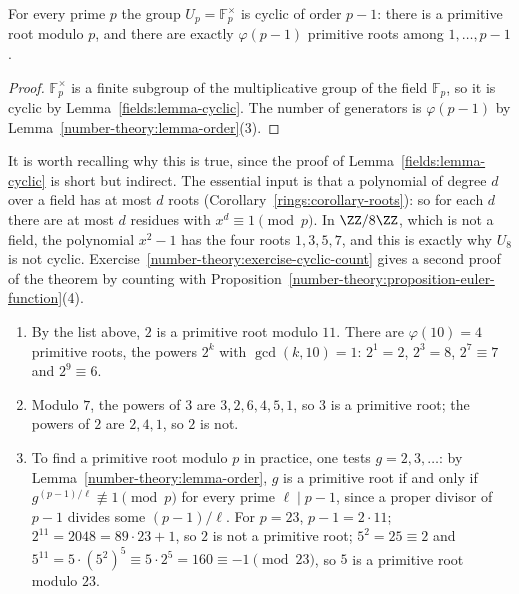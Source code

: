\begin{theorem}\label{number-theory:theorem-primitive-root-prime}
For every prime $p$ the group $U_p = \mathbb{F}_p^\times$ is cyclic of order $p - 1$: there is a primitive root modulo $p$, and there are exactly $\varphi(p - 1)$ primitive roots among $1, \ldots, p - 1$.
\end{theorem}

\begin{proof}
$\mathbb{F}_p^\times$ is a finite subgroup of the multiplicative group of the field $\mathbb{F}_p$, so it is cyclic by Lemma~\ref{fields:lemma-cyclic}. The number of generators is $\varphi(p - 1)$ by
Lemma~\ref{number-theory:lemma-order}(3).
\end{proof}

It is worth recalling why this is true, since the proof of Lemma~\ref{fields:lemma-cyclic} is short but indirect. The essential input is that a polynomial of degree $d$ over a field has at most $d$ roots
(Corollary~\ref{rings:corollary-roots}): so for each $d$ there are at most $d$ residues with $x^d \equiv 1 \pmod p$. In $\ZZ/8\ZZ$, which is not a field, the polynomial $x^2 - 1$ has the four roots
$1, 3, 5, 7$, and this is exactly why $U_8$ is not cyclic. Exercise~\ref{number-theory:exercise-cyclic-count} gives a second proof of the theorem by counting with
Proposition~\ref{number-theory:proposition-euler-function}(4).

\begin{example}\label{number-theory:example-primitive-roots}
\begin{enumerate}
\item By the list above, $2$ is a primitive root modulo $11$. There are $\varphi(10) = 4$ primitive roots, the powers $2^k$ with $\gcd(k, 10) = 1$: $2^1 = 2$, $2^3 = 8$, $2^7 \equiv 7$ and $2^9 \equiv 6$.
\item Modulo $7$, the powers of $3$ are $3, 2, 6, 4, 5, 1$, so $3$ is a primitive root; the powers of $2$ are $2, 4, 1$, so $2$ is not.
\item To find a primitive root modulo $p$ in practice, one tests $g = 2, 3, \ldots$: by Lemma~\ref{number-theory:lemma-order}, $g$ is a primitive root if and only if $g^{(p-1)/\ell} \not\equiv 1 \pmod p$
for every prime $\ell \mid p - 1$, since a proper divisor of $p - 1$ divides some $(p - 1)/\ell$. For $p = 23$, $p - 1 = 2 \cdot 11$; $2^{11} = 2048 = 89 \cdot 23 + 1$, so $2$ is not a primitive root;
$5^2 = 25 \equiv 2$ and $5^{11} = 5 \cdot (5^2)^5 \equiv 5 \cdot 2^5 = 160 \equiv -1 \pmod{23}$, so $5$ is a primitive root modulo $23$.
\end{enumerate}
\end{example}

